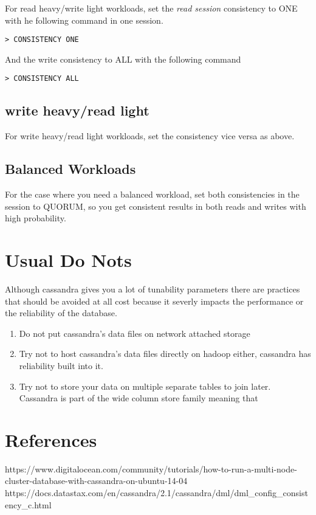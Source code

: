 \documentclass[9pt,twocolumn,twoside]{idsi}
\begin{document}
For read heavy/write light workloads, set the \textit{read session} consistency to ONE with he following command in one session.

\begin{lstlisting}[breaklines]
> CONSISTENCY ONE
\end{lstlisting}

And the write consistency to ALL with the following command

\begin{lstlisting}[breaklines]
> CONSISTENCY ALL
\end{lstlisting}

\subsection{write heavy/read light}

For write heavy/read light workloads, set the consistency vice versa as above. 


\subsection{Balanced Workloads}
For the case where you need a balanced workload, set both consistencies in the session to QUORUM, so you get consistent results in both reads and writes with high probability.

\section{Usual Do Nots}

Although cassandra gives you a lot of tunability parameters there are practices that should be avoided at all cost because it severly impacts the performance or the reliability of the database.

\begin{enumerate}
\item Do not put cassandra's data files on network attached storage
\item Try not to host cassandra's data files directly on hadoop either, cassandra has reliability built into it.
\item Try not to store your data on multiple separate tables to join later. Cassandra is part of the wide column store family meaning that
\end{enumerate}


\section*{References}
https://www.digitalocean.com/community/tutorials/how-to-run-a-multi-node-cluster-database-with-cassandra-on-ubuntu-14-04
https://docs.datastax.com/en/cassandra/2.1/cassandra/dml/dml_config_consistency_c.html
\end{document}
